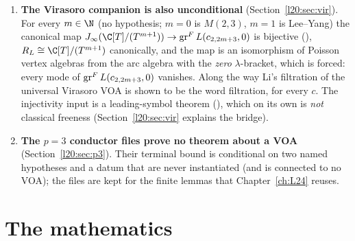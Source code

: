 \begin{enumerate}
  the arc side is built on the \emph{presented} arc algebra $\ltwentyJ(\C[e,h,f]/I_m)$, which \emph{serves as}
  $\ltwentyJ R_V$ through the universal arc  and its proved universal property
  (); there is no $\ltwentyJ$ functor on abstract algebras. The type of
   is a bijection of sets for each coefficient algebra; its naturality in the coefficient
  algebra is a separate theorem (), and together they say that the presented arc algebra
  represents the arc functor of $R_V$ (the bundled textbook form is ).
  The type of  is an abstract isomorphism; it is canonical \emph{by theorem}
  (, ). A few docstrings are
  stale (they still call the now-proved character equality ``remaining''). These are listed in
  Section~\ref{l20:sec:defects}.
\item \textbf{The Virasoro companion is also unconditional} (Section~\ref{l20:sec:vir}). For every $m\in\N$ (no hypothesis;
  $m=0$ is $M(2,3)$, $m=1$ is Lee--Yang) the canonical map $\ltwentyJ(\C[T]/(T^{m+1}))\to\ltwentygr L(c_{2,2m+3},0)$ is bijective
  (), $R_{L}\cong\C[T]/(T^{m+1})$ canonically, and the map is an isomorphism of
  Poisson vertex algebras from the arc algebra with the \emph{zero} $\lambda$-bracket, which is forced: every mode of
  $\operatorname{gr}^F L(c_{2,2m+3},0)$ vanishes. Along the way Li's filtration of the universal Virasoro VOA is shown to be the word filtration,
  for every $c$. The injectivity input is a leading-symbol theorem (), which on its own is \emph{not}
  classical freeness (Section~\ref{l20:sec:vir} explains the bridge).
\item \textbf{The $p=3$ conductor files prove no theorem about a VOA} (Section~\ref{l20:sec:p3}). Their terminal bound is conditional on
  two named hypotheses and a datum  that are never instantiated (and  is
  connected to no VOA); the files are kept for the finite lemmas that Chapter~\ref{ch:L24} reuses.
\end{enumerate}

\section{The mathematics}\label{l20:sec:math}

